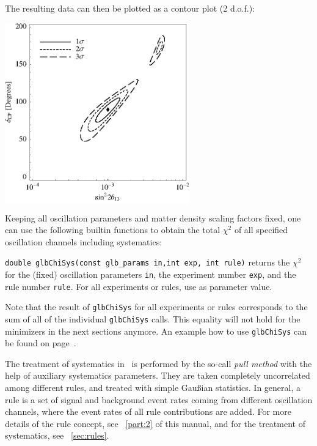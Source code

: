 {The resulting data can then be plotted as a contour plot (2 d.o.f.):
\begin{center}
\colorbox{white}{\includegraphics[width=8cm]{correx}}
\end{center}

}

Keeping all oscillation parameters and matter density scaling factors fixed,
 one can use the following builtin functions to obtain the total $\chi^2$ of all 
 specified oscillation channels including systematics:
\begin{function} 
{\tt double glbChiSys(const glb\_params in,int exp, int rule)} returns
the $\chi^2$ for the (fixed) oscillation parameters {\tt in}, the
experiment number {\tt exp}, and the rule number {\tt rule}. For all
experiments or rules, use  as parameter value.
\end{function}
Note that the result of {\tt glbChiSys} for all experiments or rules
corresponds to the sum of all of the individual {\tt glbChiSys} calls. 
This equality will not hold for the minimizers in the next sections anymore. 
 An example how to use  {\tt glbChiSys} can be found on page~\pageref{ex:corrth13dcp}.  

 
The treatment of systematics in \GLOBES\ is performed by the so-call
{\em pull method} with the help of auxiliary systematics parameters.
They are taken completely uncorrelated among different rules, and treated with simple Gau\ss ian statistics. In general, a rule is a set 
of signal and background event rates coming from different oscillation
channels, where the event rates of all rule contributions are added.
For more details of the rule concept, see \Part~\ref{part:2} of this manual,
and for the treatment of systematics, see \Sec~\ref{sec:rules}.
 
